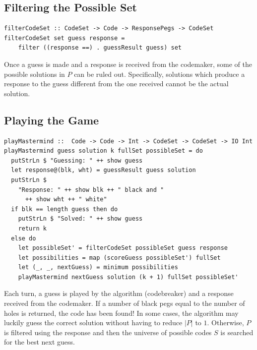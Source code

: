 \documentclass{article}
\begin{document}
\subsection{Filtering the Possible Set}
\begin{verbatim}
filterCodeSet :: CodeSet -> Code -> ResponsePegs -> CodeSet
filterCodeSet set guess response =
    filter ((response ==) . guessResult guess) set
\end{verbatim}
Once a guess is made and a response is received from the codemaker, some of the possible solutions in $P$ can be ruled out. Specifically, solutions which produce a response to the guess different from the one received cannot be the actual solution.

\subsection{Playing the Game}
\begin{verbatim}
playMastermind ::  Code -> Code -> Int -> CodeSet -> CodeSet -> IO Int
playMastermind guess solution k fullSet possibleSet = do
  putStrLn $ "Guessing: " ++ show guess
  let response@(blk, wht) = guessResult guess solution
  putStrLn $
    "Response: " ++ show blk ++ " black and "
      ++ show wht ++ " white"
  if blk == length guess then do
    putStrLn $ "Solved: " ++ show guess
    return k
  else do
    let possibleSet' = filterCodeSet possibleSet guess response
    let possibilities = map (scoreGuess possibleSet') fullSet
    let (_, _, nextGuess) = minimum possibilities
    playMastermind nextGuess solution (k + 1) fullSet possibleSet'
\end{verbatim}
Each turn, a guess is played by the algorithm (codebreaker) and a response received from the codemaker. If a number of black pegs equal to the number of holes is returned, the code has been found! In some cases, the algorithm may luckily guess the correct solution without having to reduce $|P|$ to $1$. Otherwise, $P$ is filtered using the response and then the universe of possible codes $S$ is searched for the best next guess.
\end{document}
